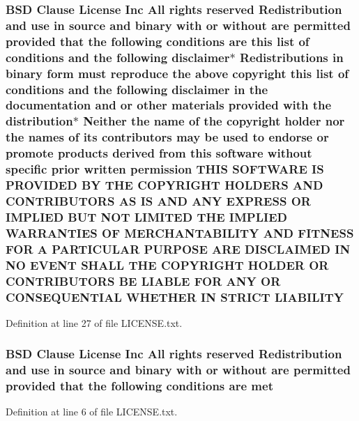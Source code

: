 \subsubsection[{\texorpdfstring{L\+I\+A\+B\+I\+L\+I\+TY}{LIABILITY}}]{\setlength{\rightskip}{0pt plus 5cm}B\+SD Clause License Inc All rights reserved Redistribution and use in source and binary with or without are permitted provided that the following conditions are this list of conditions and the following disclaimer$\ast$ Redistributions in binary form must reproduce the above copyright this list of conditions and the following disclaimer in the documentation and or other materials provided with the distribution$\ast$ Neither the name of the copyright holder nor the names of its contributors may be used to endorse or promote products derived from this software without specific prior written permission T\+H\+IS S\+O\+F\+T\+W\+A\+RE IS P\+R\+O\+V\+I\+D\+ED BY T\+HE C\+O\+P\+Y\+R\+I\+G\+HT H\+O\+L\+D\+E\+RS A\+ND C\+O\+N\+T\+R\+I\+B\+U\+T\+O\+RS AS IS A\+ND A\+NY E\+X\+P\+R\+E\+SS OR I\+M\+P\+L\+I\+ED B\+UT N\+OT L\+I\+M\+I\+T\+ED T\+HE I\+M\+P\+L\+I\+ED {\bf W\+A\+R\+R\+A\+N\+T\+I\+ES} OF M\+E\+R\+C\+H\+A\+N\+T\+A\+B\+I\+L\+I\+TY A\+ND F\+I\+T\+N\+E\+SS F\+OR A P\+A\+R\+T\+I\+C\+U\+L\+AR P\+U\+R\+P\+O\+SE A\+RE D\+I\+S\+C\+L\+A\+I\+M\+ED IN NO E\+V\+E\+NT S\+H\+A\+LL T\+HE C\+O\+P\+Y\+R\+I\+G\+HT H\+O\+L\+D\+ER OR C\+O\+N\+T\+R\+I\+B\+U\+T\+O\+RS BE L\+I\+A\+B\+LE F\+OR A\+NY OR C\+O\+N\+S\+E\+Q\+U\+E\+N\+T\+I\+AL W\+H\+E\+T\+H\+ER IN S\+T\+R\+I\+CT L\+I\+A\+B\+I\+L\+I\+TY}\hypertarget{LICENSE_8txt_a416744a998d192df4986ba8975d9bb08}{}\label{LICENSE_8txt_a416744a998d192df4986ba8975d9bb08}


Definition at line 27 of file L\+I\+C\+E\+N\+S\+E.\+txt.

\subsubsection[{\texorpdfstring{met}{met}}]{\setlength{\rightskip}{0pt plus 5cm}B\+SD Clause License Inc All rights reserved Redistribution and use in source and binary with or without are permitted provided that the following conditions are met}\hypertarget{LICENSE_8txt_ab7f07fad302c934549e076cb99c8b69b}{}\label{LICENSE_8txt_ab7f07fad302c934549e076cb99c8b69b}


Definition at line 6 of file L\+I\+C\+E\+N\+S\+E.\+txt.

